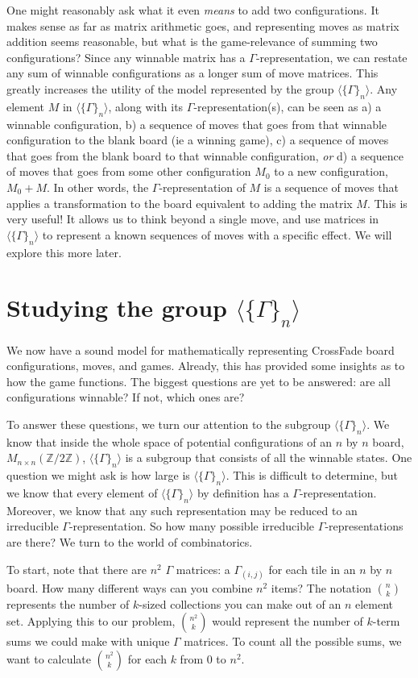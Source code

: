 \documentclass{article}[12pt]
\newcommand{\gen}[2]{\Gamma_{(#1,#2)}}
\newcommand{\group}[1]{M_{#1 \times #1}(\mathbb{Z}/2\mathbb{Z})}
\newcommand{\subgroup}[1]{\langle\{\Gamma\}_{#1}\rangle}
\begin{document}
One might reasonably ask what it even \emph{means} to add two configurations.  It makes sense as far as matrix arithmetic goes, and representing moves as matrix addition seems reasonable, but what is the game-relevance of summing two configurations?  Since any winnable matrix has a $\Gamma$-representation, we can restate any sum of winnable configurations as a longer sum of move matrices.  This greatly increases the utility of the model represented by the group $\subgroup{n}$.  Any element $M$ in $\subgroup{n}$, along with its $\Gamma$-representation(s), can be seen as a) a winnable configuration, b) a sequence of moves that goes from that winnable configuration to the blank board (ie a winning game), c) a sequence of moves that goes from the blank board to that winnable configuration, \emph{or} d) a sequence of moves that goes from some other configuration $M_0$ to a new configuration, $M_0 + M$.  In other words, the $\Gamma$-representation of $M$ is a sequence of moves that applies a transformation to the board equivalent to adding the matrix $M$.  This is very useful!  It allows us to think beyond a single move, and use matrices in $\subgroup{n}$ to represent a known sequences of moves with a specific effect.  We will explore this more later.

\section{Studying the group $\subgroup{n}$}

We now have a sound model for mathematically representing CrossFade board configurations, moves, and games.  Already, this has provided some insights as to how the game functions.  The biggest questions are yet to be answered: are all configurations winnable?  If not, which ones are?

To answer these questions, we turn our attention to the subgroup $\subgroup{n}$.  We know that inside the whole space of potential configurations of an $n$ by $n$ board, $\group{n}$, $\subgroup{n}$ is a subgroup that consists of all the winnable states.  One question we might ask is how large is $\subgroup{n}$.  This is difficult to determine, but we know that every element of $\subgroup{n}$ by definition has a $\Gamma$-representation.  Moreover, we know that any such representation may be reduced to an irreducible $\Gamma$-representation.  So how many possible irreducible $\Gamma$-representations are there?  We turn to the world of combinatorics.

To start, note that there are $n^2$ $\Gamma$ matrices: a $\gen{i}{j}$ for each tile in an $n$ by $n$ board.  How many different ways can you combine $n^2$ items?  The notation $n \choose k$ represents the number of $k$-sized collections you can make out of an $n$ element set.  Applying this to our problem, $n^2 \choose k$ would represent the number of $k$-term sums we could make with unique $\Gamma$ matrices.  To count all the possible sums, we want to calculate $n^2 \choose k$ for each $k$ from 0 to $n^2$.
\end{document}
